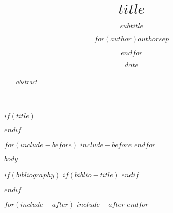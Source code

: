 \documentclass[12pt,letterpaper,]{article}
\title{$title$}
\subtitle{$subtitle$}
\author{$for(author)$$author$$sep$ \and $endfor$}
\date{$date$}
\begin{document}
$if(title)$
\maketitle
$endif$

\begin{abstract}
$abstract$
\end{abstract}
\thispagestyle{empty}
\clearpage

\setcounter{page}{1}

$for(include-before)$
$include-before$
$endfor$

$body$

$if(bibliography)$
$if(biblio-title)$
\renewcommand\refname{$biblio-title$}
$endif$

$endif$

$for(include-after)$
$include-after$
$endfor$
\end{document}
